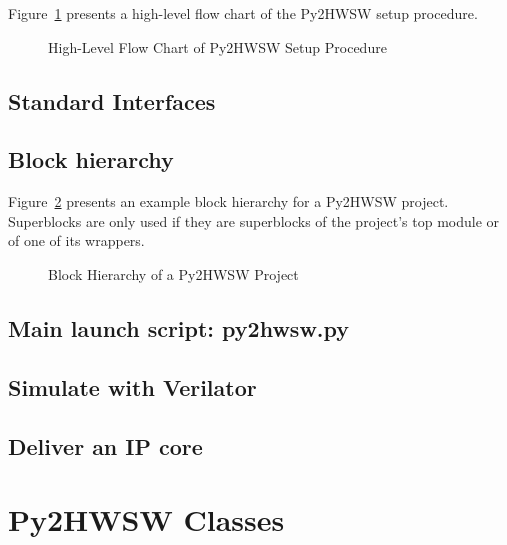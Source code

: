 \documentclass{ug}
\begin{document}
Figure~\ref{fig:py2_flow_chart} presents a high-level flow chart of the Py2HWSW setup procedure.

\begin{figure}[H]
  \vspace{-0.7cm}
  \caption{High-Level Flow Chart of Py2HWSW Setup Procedure}
  \label{fig:py2_flow_chart}
\end{figure}

\subsection{Standard Interfaces}
\label{sec:py2_standard_interfaces}


\subsection{Block hierarchy}
\label{sec:py2_block_hierarchy}

Figure~\ref{fig:py2_superblocks_subblocks} presents an example block hierarchy for a Py2HWSW project.
Superblocks are only used if they are superblocks of the project's top module or of one of its wrappers.

\begin{figure}[H]
  \vspace{-0.7cm}
  \caption{Block Hierarchy of a Py2HWSW Project}
  \label{fig:py2_superblocks_subblocks}
\end{figure}

\subsection{Main launch script: py2hwsw.py}
\label{sec:launch_script}


\subsection{Simulate with Verilator}
\label{sec:verilator}


\subsection{Deliver an IP core}
\label{sec:deliver}

%
%
\section{Py2HWSW Classes}
\label{sec:py_classes}
\end{document}
